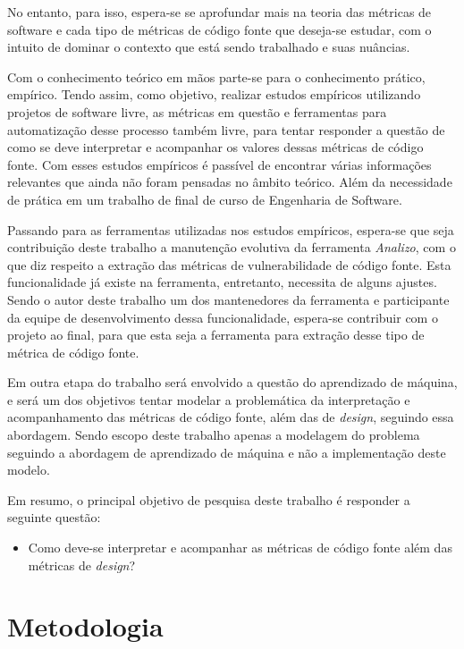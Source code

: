 No entanto, para isso, espera-se se aprofundar mais na teoria das métricas de
software e cada tipo de métricas de código fonte que deseja-se estudar, com o 
intuito de dominar o contexto que está sendo trabalhado e suas nuâncias.

Com o conhecimento teórico em mãos parte-se para o conhecimento prático,
empírico. Tendo assim, como objetivo, realizar estudos empíricos utilizando 
projetos de software livre, as métricas em questão e ferramentas para 
automatização desse processo também livre, para tentar responder a questão de 
como se deve interpretar e acompanhar os valores dessas métricas de código fonte.
Com esses estudos empíricos é passível de encontrar várias informações relevantes
que ainda não foram pensadas no âmbito teórico. Além da necessidade de prática
em um trabalho de final de curso de Engenharia de Software.

Passando para as ferramentas utilizadas nos estudos empíricos, espera-se que
seja contribuição deste trabalho a manutenção evolutiva da ferramenta
\emph{Analizo}, com o que diz respeito a extração das métricas de
vulnerabilidade de código fonte. Esta funcionalidade já existe na ferramenta,
entretanto, necessita de alguns ajustes. Sendo o autor deste trabalho um dos
mantenedores da ferramenta e participante da equipe de desenvolvimento dessa
funcionalidade, espera-se contribuir com o projeto ao final, para que esta seja
a ferramenta para extração desse tipo de métrica de código fonte.

Em outra etapa do trabalho será envolvido a questão do aprendizado de máquina, e
será um dos objetivos tentar modelar a problemática da interpretação e
acompanhamento das métricas de código fonte, além das de \textit{design},
seguindo essa abordagem. Sendo escopo deste trabalho apenas a modelagem do
problema seguindo a abordagem de aprendizado de máquina e não a implementação
deste modelo.

Em resumo, o principal objetivo de pesquisa deste trabalho é responder a
seguinte questão:

\begin{itemize}
  \item Como deve-se interpretar e acompanhar as métricas de código fonte além 
    das métricas de \textit{design}?
\end{itemize}


\section{Metodologia}

